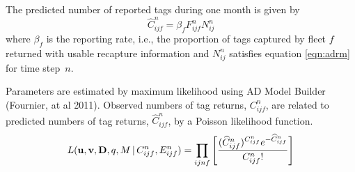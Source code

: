 \def\tobs{{C_{ijf}^n}}
\def\tpred{{{\widehat{C}}_{ijf}^n}}
\def\rr{\beta_f}

The predicted number of reported tags during one month is given by
\begin{equation}
\tpred =  \rr F_{ijf}^n N_{ij}^n
\label{eqn:catch} 
\end{equation}
where $\rr$ is the reporting rate,
i.e., the proportion of tags captured by fleet $f$
returned with usable recapture information
and  $N_{ij}^n$ satisfies equation \ref{eqn:adrm} for time step~$n$.

Parameters are estimated by maximum likelihood using AD Model Builder
(Fournier, at al 2011).
Observed numbers of tag returns, $\tobs$, are related to
predicted numbers of tag returns, $\tpred$, by a Poisson likelihood function.
\begin{equation}\label{eqn:like} 
L(\umat, \vmat, \Dmat, q, M\,|\,\tobs,E_{ijf}^n) = \prod_{ijnf}\Bigg[{ {(\tpred)^\tobs}e^{-\tpred}\over\tobs !}\Bigg]
\end{equation}


